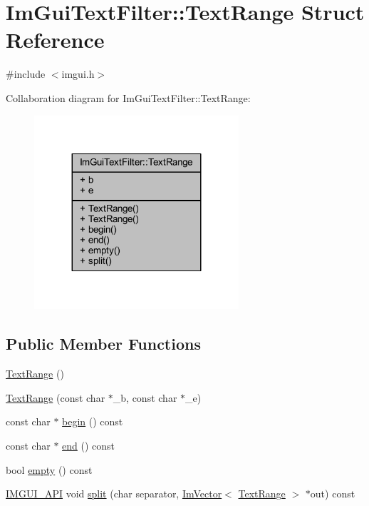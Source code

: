\hypertarget{struct_im_gui_text_filter_1_1_text_range}{}\section{Im\+Gui\+Text\+Filter\+:\+:Text\+Range Struct Reference}
\label{struct_im_gui_text_filter_1_1_text_range}


{\ttfamily \#include $<$imgui.\+h$>$}



Collaboration diagram for Im\+Gui\+Text\+Filter\+:\+:Text\+Range\+:
\nopagebreak
\begin{figure}[H]
\begin{center}
\leavevmode
\includegraphics[width=215pt]{struct_im_gui_text_filter_1_1_text_range__coll__graph}
\end{center}
\end{figure}
\subsection*{Public Member Functions}
\begin{DoxyCompactItemize}
\item 
\mbox{\hyperlink{struct_im_gui_text_filter_1_1_text_range_a5a6548fd40884ef5837e6a1ffa33af61}{Text\+Range}} ()
\item 
\mbox{\hyperlink{struct_im_gui_text_filter_1_1_text_range_a4a2b377d4fd141fc3664378041f9f007}{Text\+Range}} (const char $\ast$\+\_\+b, const char $\ast$\+\_\+e)
\item 
const char $\ast$ \mbox{\hyperlink{struct_im_gui_text_filter_1_1_text_range_ab6b04c316f081e8ad7b044a8afbda63c}{begin}} () const
\item 
const char $\ast$ \mbox{\hyperlink{struct_im_gui_text_filter_1_1_text_range_aa5d60286f4c35bfdde82219ff079de9e}{end}} () const
\item 
bool \mbox{\hyperlink{struct_im_gui_text_filter_1_1_text_range_ab8d74e3b0ce63997746828e4b8ae3bbf}{empty}} () const
\item 
\mbox{\hyperlink{imgui_8h_a43829975e84e45d1149597467a14bbf5}{I\+M\+G\+U\+I\+\_\+\+A\+PI}} void \mbox{\hyperlink{struct_im_gui_text_filter_1_1_text_range_af65b120c583d34df5eb857962a8ac912}{split}} (char separator, \mbox{\hyperlink{class_im_vector}{Im\+Vector}}$<$ \mbox{\hyperlink{struct_im_gui_text_filter_1_1_text_range}{Text\+Range}} $>$ $\ast$out) const
\end{DoxyCompactItemize}
